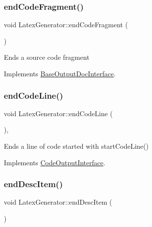 \mbox{\label{class_latex_generator_a761292f353178bad45e21ca40cbe6115}} 
\subsubsection{\texorpdfstring{endCodeFragment()}{endCodeFragment()}}
{\footnotesize\ttfamily void Latex\+Generator\+::end\+Code\+Fragment (\begin{DoxyParamCaption}{ }\end{DoxyParamCaption})\hspace{0.3cm}{\ttfamily [virtual]}}

Ends a source code fragment 

Implements \mbox{\hyperlink{class_base_output_doc_interface_a08f032482a8f23ac1aab66552db43a81}{Base\+Output\+Doc\+Interface}}.

\mbox{\label{class_latex_generator_a87b0106936769e1226310df32ec5e1a6}} 
\subsubsection{\texorpdfstring{endCodeLine()}{endCodeLine()}}
{\footnotesize\ttfamily void Latex\+Generator\+::end\+Code\+Line (\begin{DoxyParamCaption}{ }\end{DoxyParamCaption})\hspace{0.3cm}{\ttfamily [inline]}, {\ttfamily [virtual]}}

Ends a line of code started with start\+Code\+Line() 

Implements \mbox{\hyperlink{class_code_output_interface_afac5763eafc78f93b82691fb9a6dcff7}{Code\+Output\+Interface}}.

\mbox{\label{class_latex_generator_aa675b530ccd61f9c4784efc2abcedbaa}} 
\subsubsection{\texorpdfstring{endDescItem()}{endDescItem()}}
{\footnotesize\ttfamily void Latex\+Generator\+::end\+Desc\+Item (\begin{DoxyParamCaption}{ }\end{DoxyParamCaption})\hspace{0.3cm}{\ttfamily [virtual]}}

